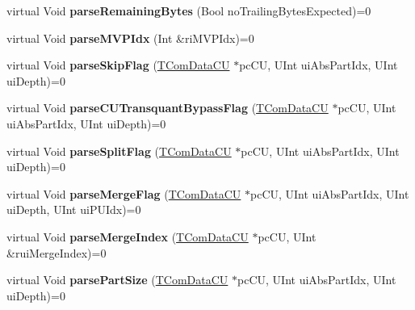 \begin{DoxyCompactItemize}
virtual Void {\bfseries parse\+Remaining\+Bytes} (Bool no\+Trailing\+Bytes\+Expected)=0
\item 
\mbox{\label{class_t_dec_entropy_if_ae66485ac2428650da90c0fc0456edbb4}} 
virtual Void {\bfseries parse\+M\+V\+P\+Idx} (Int \&ri\+M\+V\+P\+Idx)=0
\item 
\mbox{\label{class_t_dec_entropy_if_ad23cebd8892399a0cf3ed507cf006fa2}} 
virtual Void {\bfseries parse\+Skip\+Flag} (\hyperlink{class_t_com_data_c_u}{T\+Com\+Data\+CU} $\ast$pc\+CU, U\+Int ui\+Abs\+Part\+Idx, U\+Int ui\+Depth)=0
\item 
\mbox{\label{class_t_dec_entropy_if_a6a158993614df7eefe756d0ddc8dd16c}} 
virtual Void {\bfseries parse\+C\+U\+Transquant\+Bypass\+Flag} (\hyperlink{class_t_com_data_c_u}{T\+Com\+Data\+CU} $\ast$pc\+CU, U\+Int ui\+Abs\+Part\+Idx, U\+Int ui\+Depth)=0
\item 
\mbox{\label{class_t_dec_entropy_if_a62950ae34521a60a497811a40cc36ab4}} 
virtual Void {\bfseries parse\+Split\+Flag} (\hyperlink{class_t_com_data_c_u}{T\+Com\+Data\+CU} $\ast$pc\+CU, U\+Int ui\+Abs\+Part\+Idx, U\+Int ui\+Depth)=0
\item 
\mbox{\label{class_t_dec_entropy_if_af0d6994826acb967f598b3ca79b743e1}} 
virtual Void {\bfseries parse\+Merge\+Flag} (\hyperlink{class_t_com_data_c_u}{T\+Com\+Data\+CU} $\ast$pc\+CU, U\+Int ui\+Abs\+Part\+Idx, U\+Int ui\+Depth, U\+Int ui\+P\+U\+Idx)=0
\item 
\mbox{\label{class_t_dec_entropy_if_ad70024d325701f1f910f749a9b1534a6}} 
virtual Void {\bfseries parse\+Merge\+Index} (\hyperlink{class_t_com_data_c_u}{T\+Com\+Data\+CU} $\ast$pc\+CU, U\+Int \&rui\+Merge\+Index)=0
\item 
\mbox{\label{class_t_dec_entropy_if_adb38379f3ef52c625fbba4e3106167f0}} 
virtual Void {\bfseries parse\+Part\+Size} (\hyperlink{class_t_com_data_c_u}{T\+Com\+Data\+CU} $\ast$pc\+CU, U\+Int ui\+Abs\+Part\+Idx, U\+Int ui\+Depth)=0
\item 
\mbox{\label{class_t_dec_entropy_if_a730126daaff4677d1a2c19f0314c889d}} 

\end{DoxyCompactItemize}
